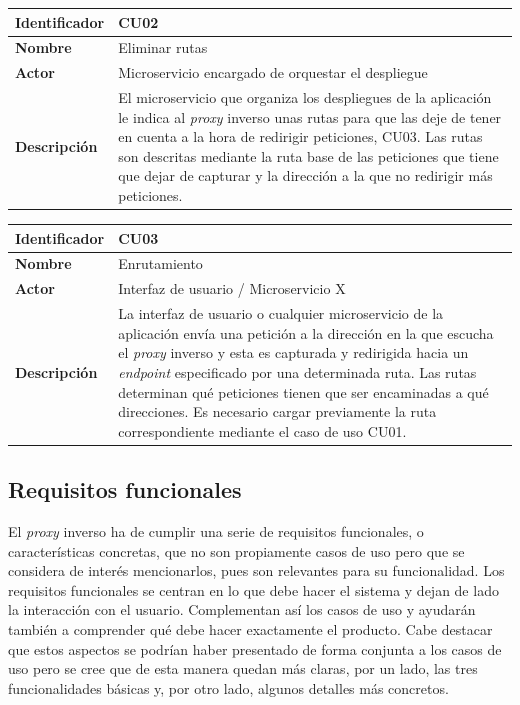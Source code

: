 \documentclass[11pt,spanish,listoffigures]{tfgetsinf}
\begin{document}
\begin{center} \begin{tabular}{| l | p{11.3cm} |}
\hline
\textbf{Identificador} & CU02
\\ \hline
\textbf{Nombre} & Eliminar rutas
\\ \hline
\textbf{Actor} & Microservicio encargado de orquestar el despliegue
\\ \hline
\textbf{Descripción} & El microservicio que organiza los despliegues de la aplicación le indica al \emph{proxy} inverso unas rutas para que las deje de tener en cuenta a la hora de redirigir peticiones, CU03. Las rutas son descritas mediante la ruta base de las peticiones que tiene que dejar de capturar y la dirección a la que no redirigir más peticiones.
\\ \hline \end{tabular} \end{center}

\begin{center} \begin{tabular}{| l | p{11.3cm} |}
\hline
\textbf{Identificador} & CU03
\\ \hline
\textbf{Nombre} & Enrutamiento
\\ \hline
\textbf{Actor} & Interfaz de usuario / Microservicio X
\\ \hline
\textbf{Descripción} & La interfaz de usuario o cualquier microservicio de la aplicación envía una petición a la dirección en la que escucha el \emph{proxy} inverso y esta es capturada y redirigida hacia un \emph{endpoint} especificado por una determinada ruta. Las rutas determinan qué peticiones tienen que ser encaminadas a qué direcciones. Es necesario cargar previamente la ruta correspondiente mediante el caso de uso CU01.
\\ \hline \end{tabular} \end{center}


		\subsection{Requisitos funcionales}

El \emph{proxy} inverso ha de cumplir una serie de requisitos funcionales, o características concretas, que no son propiamente casos de uso pero que se considera de interés mencionarlos, pues son relevantes para su funcionalidad. Los requisitos funcionales se centran en lo que debe hacer el sistema y dejan de lado la interacción con el usuario. Complementan así los casos de uso y ayudarán también a comprender qué debe hacer exactamente el producto. Cabe destacar que estos aspectos se podrían haber presentado de forma conjunta a los casos de uso pero se cree que de esta manera quedan más claras, por un lado, las tres funcionalidades básicas y, por otro lado, algunos detalles más concretos.
\end{document}

